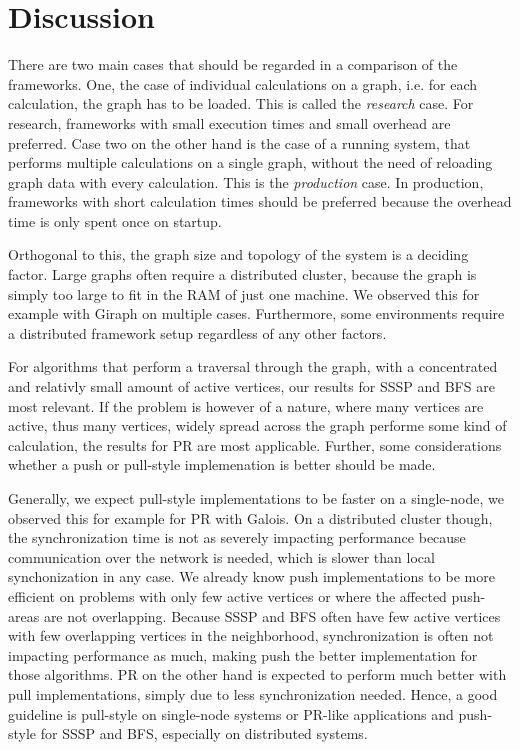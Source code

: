 
\section{Discussion}

There are two main cases that should be regarded in a comparison of the frameworks. One, the case of individual calculations on a graph, i.e. for each calculation, the graph has to be loaded. This is called the \emph{research} case. For research, frameworks with small execution times and small overhead are preferred. Case two on the other hand is the case of a running system, that performs multiple calculations on a single graph, without the need of reloading graph data with every calculation. This is the \emph{production} case.
In production, frameworks with short calculation times should be preferred because the overhead time is only spent once on startup.

Orthogonal to this, the graph size and topology of the system is a deciding factor. Large graphs often require a distributed cluster, because the graph is simply too large to fit in the RAM of just one machine. We observed this for example with Giraph on multiple cases.
Furthermore, some environments require a distributed framework setup regardless of any other factors.

For algorithms that perform a traversal through the graph, with a concentrated and relativly small amount of active vertices, our results for SSSP and BFS are most relevant.
If the problem is however of a nature, where many vertices are active, thus many vertices, widely spread across the graph performe some kind of calculation, the results for PR are most applicable.
Further, some considerations whether a push or pull-style implemenation is better should be made.

Generally, we expect pull-style implementations to be faster on a single-node, we observed this for example for PR with Galois.
On a distributed cluster though, the synchronization time is not as severely impacting performance because communication over the network is needed, which is slower than local synchonization in any case.
We already know push implementations to be more efficient on problems with only few active vertices or where the affected push-areas are not overlapping. 
Because SSSP and BFS often have few active vertices with few overlapping vertices in the neighborhood, synchronization is often not impacting performance as much, making push the better implementation for those algorithms.
PR on the other hand is expected to perform much better with pull implementations, simply due to less synchronization needed.
Hence, a good guideline is pull-style on single-node systems or PR-like applications and push-style for SSSP and BFS, especially on distributed systems.



